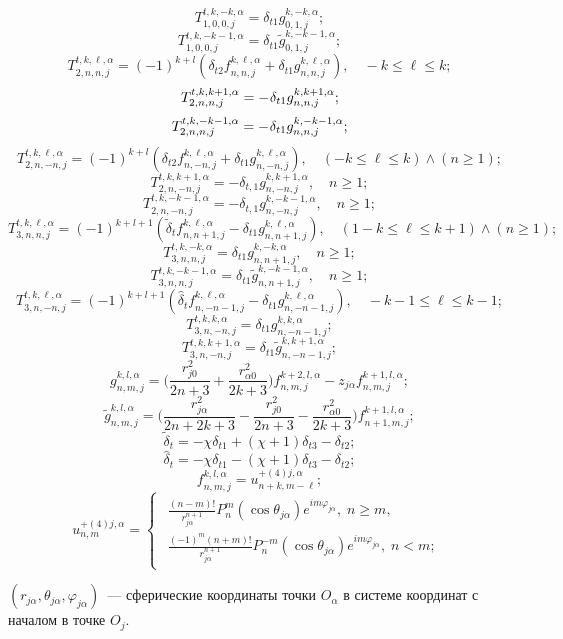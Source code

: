 \begin{theorem}
\[T_{1,0,0,j}^{t,k, - k,\alpha } = {\delta _{t1}}{g}_{0,1,j}^{k, - k,\alpha };\]
\[T_{1,0,0,j}^{t,k, - k - 1,\alpha } = {\delta _{t1}}{\tilde g}_{0,1,j}^{k, - k - 1,\alpha };\]
\[T_{2,n,n,j}^{t,k,\ell ,\alpha } = (-1)^{k+l}({\delta _{t2}}{f}_{n,n,j}^{k,\ell ,\alpha } + {\delta _{t1}}{g}_{n,n,j}^{k,\ell ,\alpha }),\quad - k \le \ell  \le k;\]
\[T_{2,n,n,j}^{t,k,k+1,\alpha } =  - {\mkern 1mu} {\delta _{t1}}{g}_{n,n,j}^{k,k+1,\alpha };\]
\[T_{2,n,n,j}^{t,k, - k - 1,\alpha } =  - {\mkern 1mu} {\delta _{t1}}{g}_{n,n,j}^{k, - k - 1,\alpha };\]
\[T_{2,n, - n,j}^{t,k,\ell ,\alpha } = (-1)^{k+l}({\delta _{t2}}{f}_{n, - n,j}^{k,\ell ,\alpha } + {\delta _{t1}}{g}_{n, - n,j}^{k,\ell ,\alpha }),\quad (- k \le \ell  \le k) \wedge (n\ge 1);\]
\[T_{2,n, - n,j}^{t,k,k+1,\alpha } =  - {\delta _{t,1}}{g}_{n, - n,j}^{k,k + 1,\alpha },\quad n\ge 1;\]
\[T_{2,n, - n,j}^{t,k,-k-1,\alpha } =  - {\delta _{t,1}}{g}_{n, - n,j}^{k,-k-1,\alpha },\quad n\ge 1;\]
\[T_{3,n,n,j}^{t,k,\ell ,\alpha } = (-1)^{k+l+1}({\tilde \delta _t}{f}_{n,n + 1,j}^{k,\ell ,\alpha } - {\delta _{t1}}{g}_{n,n + 1,j}^{k,\ell ,\alpha }),\quad (1 - k \le \ell  \le k + 1) \wedge (n \ge 1);\]
\[T_{3,n,n,j}^{t,k, - k,\alpha } =  {\delta _{t1}}{g}_{n,n + 1,j}^{k, - k,\alpha },\quad n\ge 1;\]
\[T_{3,n,n,j}^{t,k, - k - 1,\alpha } = {\delta _{t1}}{\tilde g}_{n,n+1,j}^{k, - k - 1,\alpha },\quad n\ge 1;\]
\[T_{3,n, - n,j}^{t,k,\ell ,\alpha } = (-1)^{k+l+1}({\hat \delta _t}{f}_{n, - n - 1,j}^{k,\ell ,\alpha } - {\delta _{t1}}{g}_{n, - n - 1,j}^{k,\ell ,\alpha }),\quad - k - 1 \le \ell  \le k - 1;\]
\[T_{3,n, - n,j}^{t,k,k,\alpha } = {\delta _{t1}}{g}_{n, - n - 1,j}^{k,k,\alpha };\]
\[T_{3,n, - n,j}^{t,k,k + 1,\alpha } = {\delta _{t1}}{\tilde g}_{n,-n-1,j}^{k,k + 1,\alpha };\]
\[g_{n,m,j}^{k,l,\alpha}=\bigg(\frac{r_{j0}^2}{2n+3}+\frac{r_{\alpha 0}^2}{2k+3}\bigg)f_{n,m,j}^{k+2,l,\alpha}-z_{j\alpha}f_{n,m,j}^{k+1,l,\alpha};\]
\[{\tilde g}_{n,m,j}^{k,l,\alpha}=\bigg(\frac{r_{j\alpha}^2}{2n+2k+3}-\frac{r_{j0}^2}{2n+3}-\frac{r_{\alpha 0}^2}{2k+3}\bigg)f_{n+1,m,j}^{k+1,l,\alpha};\]
\[{\tilde \delta _t} =  - \chi {\delta _{t1}} + (\chi  + 1){\delta _{t3}} - {\delta _{t2}};\]
\[{\hat \delta _t} =  - \chi {\delta _{t1}} - (\chi  + 1){\delta _{t3}} - {\delta _{t2}};\]
\[{f}_{n,m,j}^{k,l,\alpha } = {u}_{n+k,m - \ell }^{ + (4)j,\alpha };\]
\[{{u}}_{n,m}^{ + (4)j,\alpha } = \left\{ {\begin{array}{*{20}{l}}
\begin{array}{l}
\frac{{(n - m)!}}{{r_{j\alpha }^{n + 1}}}P_n^m(\cos {\theta _{j\alpha }}){e^{im{\varphi _{j\alpha }}}},\;n \ge m,\\
\frac{{{{( - 1)}^m}(n + m)!}}{{r_{j\alpha }^{n + 1}}}P_n^{ - m}(\cos {\theta _{j\alpha }}){e^{im{\varphi _{j\alpha }}}},\;n < m;
\end{array}
\end{array}} \right.\]

\noindent $(r_{j\alpha},\theta_{j\alpha},\varphi_{j\alpha})$~--- сферические координаты точки $O_\alpha$ в системе координат с началом в точке $O_j$.
\end{theorem}

